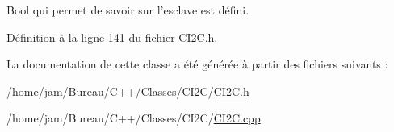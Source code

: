 Bool qui permet de savoir sur l'esclave est défini. 



Définition à la ligne 141 du fichier C\+I2\+C.\+h.



La documentation de cette classe a été générée à partir des fichiers suivants \+:\begin{DoxyCompactItemize}
\item 
/home/jam/\+Bureau/\+C++/\+Classes/\+C\+I2\+C/\hyperlink{_c_i2_c_8h}{C\+I2\+C.\+h}\item 
/home/jam/\+Bureau/\+C++/\+Classes/\+C\+I2\+C/\hyperlink{_c_i2_c_8cpp}{C\+I2\+C.\+cpp}\end{DoxyCompactItemize}

